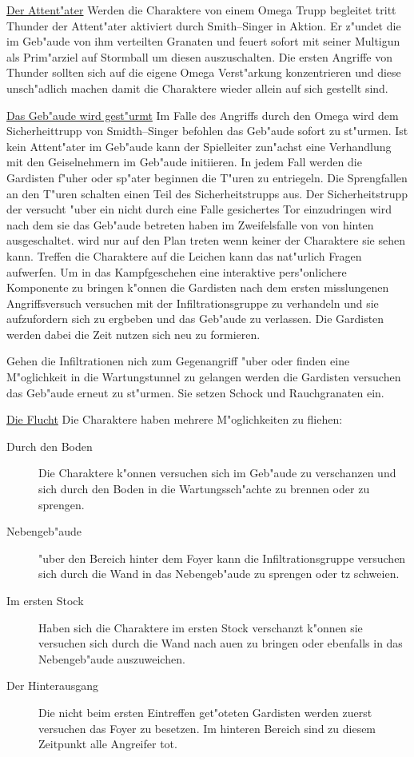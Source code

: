 \underline{Der Attent"ater} Werden die Charaktere von einem Omega Trupp begleitet tritt Thunder der Attent"ater aktiviert durch 
Smith--Singer in Aktion. Er z"undet die im Geb"aude von ihm verteilten Granaten und feuert sofort mit seiner Multigun als Prim"arziel auf Stormball um diesen auszuschalten. Die ersten Angriffe von Thunder sollten sich auf die eigene Omega Verst"arkung konzentrieren und diese
unsch"adlich machen damit die Charaktere wieder allein auf sich gestellt sind.

\underline{Das Geb"aude wird gest"urmt} Im Falle des Angriffs durch den Omega wird dem Sicherheittrupp von Smidth--Singer befohlen das Geb"aude sofort zu st"urmen. Ist kein Attent"ater im Geb"aude kann der Spielleiter zun"achst eine Verhandlung mit den Geiselnehmern im Geb"aude initiieren. In jedem Fall werden die Gardisten f"uher oder sp"ater beginnen die T"uren zu entriegeln. Die Sprengfallen an den T"uren schalten einen Teil des Sicherheitstrupps aus. Der Sicherheitstrupp der versucht "uber ein nicht durch eine Falle gesichertes Tor einzudringen wird nach dem sie das Geb"aude betreten haben im Zweifelsfalle von \xl{} von hinten ausgeschaltet. \xl{} wird nur auf den Plan treten wenn keiner der Charaktere sie sehen kann. Treffen die Charaktere auf die Leichen kann das nat"urlich Fragen aufwerfen. Um in das Kampfgeschehen eine interaktive pers"onlichere Komponente zu bringen k"onnen die Gardisten nach dem ersten misslungenen Angriffsversuch versuchen mit der Infiltrationsgruppe zu verhandeln und sie aufzufordern sich zu ergbeben und das Geb"aude zu verlassen. Die Gardisten werden dabei die Zeit nutzen sich neu zu formieren.

Gehen die Infiltrationen nich zum Gegenangriff "uber oder finden eine M"oglichkeit in die Wartungstunnel zu gelangen werden die Gardisten versuchen das Geb"aude erneut zu st"urmen. Sie setzen Schock und Rauchgranaten ein.

\underline{Die Flucht} Die Charaktere haben mehrere M"oglichkeiten zu fliehen:

\begin{description}
	\item [Durch den Boden] Die Charaktere k"onnen versuchen sich im Geb"aude zu verschanzen und sich durch den Boden in die 		
		Wartungssch"achte zu brennen oder zu sprengen.
	\item [Nebengeb"aude] "uber den Bereich hinter dem Foyer kann die Infiltrationsgruppe versuchen sich durch die Wand in das 		
		Nebengeb"aude zu sprengen oder tz schwei\3en.
	\item [Im ersten Stock] Haben sich die Charaktere im ersten Stock verschanzt k"onnen sie versuchen sich durch die Wand nach au\3en zu 		bringen oder ebenfalls in das Nebengeb"aude auszuweichen.
	\item [Der Hinterausgang] Die nicht beim ersten Eintreffen get"oteten Gardisten werden zuerst versuchen das Foyer zu besetzen. Im hinteren Bereich sind zu diesem Zeitpunkt alle Angreifer tot.	
\end{description}


